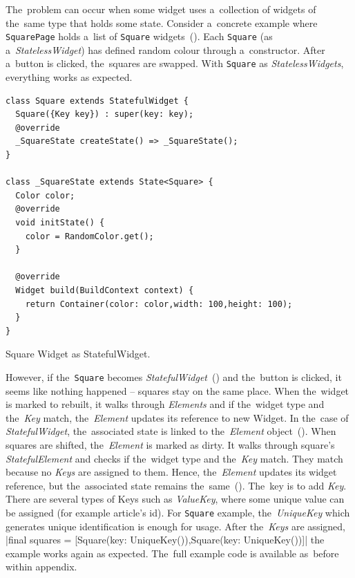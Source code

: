 The~problem can occur when some widget uses a~collection of widgets of the~same type that holds some state. Consider a~concrete example where \verb|SquarePage| holds a~list of \verb|Square| widgets~(). Each \verb|Square| (as a~\textit{StatelessWidget}) has defined random colour through a~constructor. After a~button is clicked, the~squares are swapped. With \verb|Square| as \textit{StatelessWidgets}, everything works as expected. 

\begin{listing}[ht]
\begin{verbatim}
class Square extends StatefulWidget {
  Square({Key key}) : super(key: key);
  @override
  _SquareState createState() => _SquareState();
}

class _SquareState extends State<Square> {
  Color color;
  @override
  void initState() {
    color = RandomColor.get();
  }

  @override
  Widget build(BuildContext context) {
    return Container(color: color,width: 100,height: 100);
  }
}
\end{verbatim}
\caption{Square Widget as StatefulWidget.}
\label{listing:keys_square_stateful}
\end{listing}

However, if the~\verb|Square| becomes \textit{StatefulWidget}~() and the~button is clicked, it seems like nothing happened -- squares stay on the same place. When the~widget is marked to rebuilt, it walks through \textit{Elements} and if the~widget type and the~\textit{Key} match, the~\textit{Element} updates its reference to new Widget. In the~case of \textit{StatefulWidget}, the~associated state is linked to the~\textit{Element} object~(). When squares are shifted, the~\textit{Element} is marked as dirty. It walks through square's \textit{StatefulElement} and checks if the~widget type and the~\textit{Key} match. They match because no \textit{Keys} are assigned to them. Hence, the~\textit{Element} updates its widget reference, but the~associated state remains the~same~(). 
The~key is to add \textit{Key}. There are several types of Keys such as \textit{ValueKey}, where some unique value can be assigned (for example article's id). For \verb|Square| example, the~\textit{UniqueKey} which generates unique identification is enough for usage.  After the~\textit{Keys} are assigned, |final squares = [Square(key: UniqueKey()),Square(key: UniqueKey())]| the example works again as expected. The~full example code is available as~before within appendix.

